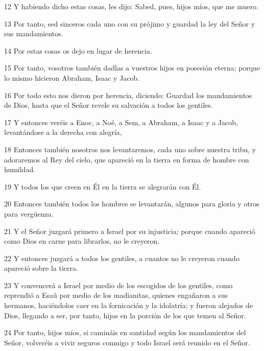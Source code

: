\par 12 Y habiendo dicho estas cosas, les dijo: Sabed, pues, hijos míos, que me muero.

\par 13 Por tanto, sed sinceros cada uno con su prójimo y guardad la ley del Señor y sus mandamientos.

\par 14 Por estas cosas os dejo en lugar de herencia.

\par 15 Por tanto, vosotros también dadlas a vuestros hijos en posesión eterna; porque lo mismo hicieron Abraham, Isaac y Jacob.

\par 16 Por todo esto nos dieron por herencia, diciendo: Guardad los mandamientos de Dios, hasta que el Señor revele su salvación a todos los gentiles.

\par 17 Y entonces veréis a Enoc, a Noé, a Sem, a Abraham, a Isaac y a Jacob, levantándose a la derecha con alegría,

\par 18 Entonces también nosotros nos levantaremos, cada uno sobre nuestra tribu, y adoraremos al Rey del cielo, que apareció en la tierra en forma de hombre con humildad.

\par 19 Y todos los que creen en Él en la tierra se alegrarán con Él.

\par 20 Entonces también todos los hombres se levantarán, algunos para gloria y otros para vergüenza.

\par 21 Y el Señor juzgará primero a Israel por su injusticia; porque cuando apareció como Dios en carne para librarlos, no le creyeron.

\par 22 Y entonces juzgará a todos los gentiles, a cuantos no le creyeron cuando apareció sobre la tierra.

\par 23 Y convencerá a Israel por medio de los escogidos de los gentiles, como reprendió a Esaú por medio de los madianitas, quienes engañaron a sus hermanos, haciéndolos caer en la fornicación y la idolatría; y fueron alejados de Dios, llegando a ser, por tanto, hijos en la porción de los que temen al Señor.

\par 24 Por tanto, hijos míos, si camináis en santidad según los mandamientos del Señor, volveréis a vivir seguros conmigo y todo Israel será reunido en el Señor.

